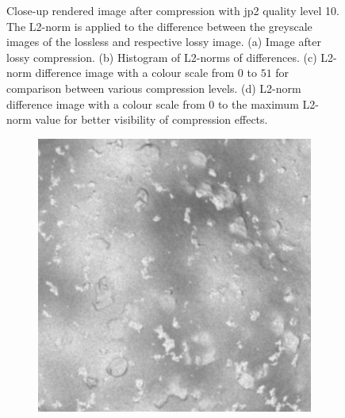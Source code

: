 \begin{figure}[htb]
\begin{subfigure}[b]{0.48\textwidth}
        \caption{}
        \label{fig:img_quality_comp_jp2_10_center_diff_rel}
    \end{subfigure}
    \caption{Close-up rendered image after compression with \gls{jp2} quality level 10. The L2-norm is applied to the difference between the greyscale images of the lossless and respective lossy image. (a) Image after lossy compression. (b) Histogram of L2-norms of differences. (c) L2-norm difference image with a colour scale from $0$ to $51$ for comparison between various compression levels. (d) L2-norm difference image with a colour scale from $0$ to the maximum L2-norm value for better visibility of compression effects.}
    \label{fig:img_quality_comp_jp2_10_center}
\end{figure}

\begin{figure}[htb]
    \centering
    \begin{subfigure}[b]{0.48\textwidth}
        \centering
        \includegraphics[width=\textwidth]{doc/thesis/0_figures/compare_quality/set1/jp2_100_center}
        \caption{}
        \label{fig:img_quality_comp_jp2_100_center_orig}
    \end{subfigure}
    \begin{subfigure}[b]{0.48\textwidth}
        \centering

\end{subfigure}
\end{figure}
